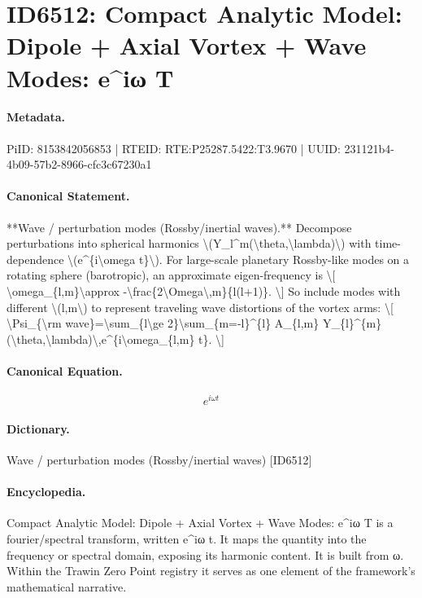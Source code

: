 \section*{ID6512: Compact Analytic Model: Dipole + Axial Vortex + Wave Modes: e\textasciicircum{}iω T}
\paragraph{Metadata.}
PiID: 8153842056853 | RTEID: RTE:P25287.5422:T3.9670 | UUID: 231121b4-4b09-57b2-8966-cfc3c67230a1

\paragraph{Canonical Statement.}
**Wave / perturbation modes (Rossby/inertial waves).** Decompose perturbations into spherical harmonics \textbackslash{}(Y\_l\textasciicircum{}m(\textbackslash{}theta,\textbackslash{}lambda)\textbackslash{}) with time-dependence \textbackslash{}(e\textasciicircum{}\{i\textbackslash{}omega t\}\textbackslash{}). For large-scale planetary Rossby-like modes on a rotating sphere (barotropic), an approximate eigen-frequency is \textbackslash{}[ \textbackslash{}omega\_\{l,m\}\textbackslash{}approx -\textbackslash{}frac\{2\textbackslash{}Omega\textbackslash{},m\}\{l(l+1)\}. \textbackslash{}] So include modes with different \textbackslash{}(l,m\textbackslash{}) to represent traveling wave distortions of the vortex arms: \textbackslash{}[ \textbackslash{}Psi\_\{\textbackslash{}rm wave\}=\textbackslash{}sum\_\{l\textbackslash{}ge 2\}\textbackslash{}sum\_\{m=-l\}\textasciicircum{}\{l\} A\_\{l,m\} Y\_\{l\}\textasciicircum{}\{m\}(\textbackslash{}theta,\textbackslash{}lambda)\textbackslash{},e\textasciicircum{}\{i\textbackslash{}omega\_\{l,m\} t\}. \textbackslash{}]

\paragraph{Canonical Equation.}
\[
e^{i\omega t}
\]

\paragraph{Dictionary.}
Wave / perturbation modes (Rossby/inertial waves) [ID6512]

\paragraph{Encyclopedia.}
Compact Analytic Model: Dipole + Axial Vortex + Wave Modes: e\textasciicircum{}iω T is a fourier/spectral transform, written e\textasciicircum{}iω t. It maps the quantity into the frequency or spectral domain, exposing its harmonic content. It is built from ω. Within the Trawin Zero Point registry it serves as one element of the framework's mathematical narrative.
